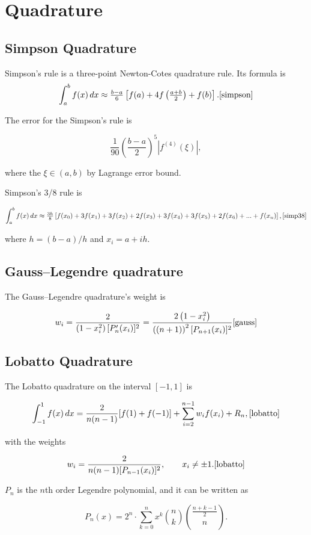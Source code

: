 \documentclass[a4paper,11pt,onecolumn]{article}
\begin{document}

\section{Quadrature} %
\label{sec:quadrature}
\subsection{Simpson Quadrature}
Simpson's rule is a three-point Newton-Cotes quadrature rule. Its formula is
\[\int _{a}^{b}f(x)\,dx\approx {\tfrac {b-a}{6}}\left[f(a)+4f\left({\tfrac {a+b}{2}}\right)+f(b)\right].
\cite{simpson}\]

The error for the Simpson's rule is

\[{\frac{1}{90}}\left({\frac{b-a}{2}}\right)^{5}\left|f^{{(4)}}(\xi )\right|,\]

where the $\xi \in (a, b)$ by Lagrange error bound. \cite{simp}

Simpson's 3/8 rule is

\[\int _{a}^{b}f(x)\,dx\approx {\tfrac {3h}{8}}\left[f(x_{0})+3f(x_{1})+3f(x_{2})+
2f(x_{3})+3f(x_{4})+3f(x_{5})+2f(x_{6})+...+f(x_{n})\right], \cite{simp38}\]

where $h=(b-a)/h$ and $x_i = a+ih$.

\subsection{Gauss–Legendre quadrature}
The Gauss–Legendre quadrature's weight is

\[w_{i}={\frac {2}{\left(1-x_{i}^{2}\right)[P'_{n}(x_{i})]^{2}}}=
\frac{2\left(1-x_{i}^2\right)}{\left((n+1)\right)^2[P_{n+1}(x_{i})]^{2}} \cite{gauss}\]

\subsection{Lobatto Quadrature}
The Lobatto quadrature on the interval $[-1,1]$ is

\[\int _{-1}^{1}{f(x)\,dx} = \frac{2}{n(n-1)}[f(1)+f(-1)] + \sum _{i=2}^{n-1}{w_{i}f(x_{i})}+R_{n},
\cite{lobatto}\]

with the weights

\[w_{i}={\frac {2}{n(n-1)[P_{n-1}(x_{i})]^{2}}},\qquad x_{i}\neq \pm 1. \cite{lobatto}\]

$P_n$ is the $n$th order Legendre polynomial, and it can be written as

\[P_{n}(x)=2^{n} \cdot \sum _{k=0}^{n}x^{k}\binom{n}{k}\binom{{\frac {n+k-1}{2}}}{n}.\]




\end{document}
